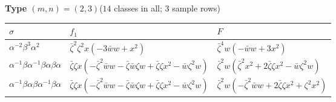 \par\medskip\noindent\textbf{Type $(m,n)=(2,3)$}\quad ($14$ classes in all; $3$ sample rows)
\par\nopagebreak\smallskip\noindent
{\small\begin{tabular}{@{}lll@{}}
\hline
$\sigma$ & $f_1$ & $F$ \\
\hline
$\alpha^{-2}\beta^{3}\alpha^{2}$ & $\bar{\zeta}^{2} \zeta^{2} x \left(- 3 \bar{w} w + x^{2}\right)$ & $\bar{\zeta}^{4} w \left(- \bar{w} w + 3 x^{2}\right)$ \\[2pt]
$\alpha^{-1}\beta\alpha^{-1}\beta\alpha\beta\alpha$ & $\bar{\zeta} \zeta x \left(- \bar{\zeta}^{2} \bar{w} w - \bar{\zeta} \bar{w} \zeta w + \bar{\zeta} \zeta x^{2} - \bar{w} \zeta^{2} w\right)$ & $\bar{\zeta}^{2} w \left(\bar{\zeta}^{2} x^{2} + 2 \bar{\zeta} \zeta x^{2} - \bar{w} \zeta^{2} w\right)$ \\[2pt]
$\alpha^{-1}\beta\alpha\beta\alpha^{-1}\beta\alpha$ & $\bar{\zeta} \zeta x \left(- \bar{\zeta}^{2} \bar{w} w - \bar{\zeta} \bar{w} \zeta w + \bar{\zeta} \zeta x^{2} - \bar{w} \zeta^{2} w\right)$ & $\bar{\zeta}^{2} w \left(- \bar{\zeta}^{2} \bar{w} w + 2 \bar{\zeta} \zeta x^{2} + \zeta^{2} x^{2}\right)$ \\[2pt]
\hline
\end{tabular}}
